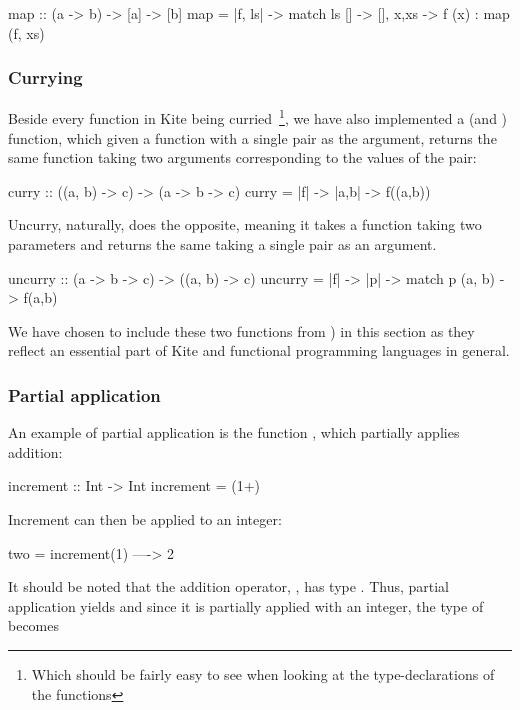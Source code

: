 \begin{kite}
map :: (a -> b) -> [a] -> [b]
map = |f, ls| -> {
  match ls {
    [] -> [],
    x,xs -> f (x) : map (f, xs)
  }
}
\end{kite}

\subsubsection{Currying}
\label{subsubsec:currying}
Beside every function in Kite being curried~\footnote{Which should be fairly easy to see when looking at the type-declarations of the functions}, we have also implemented a  (and ) function, which given a function with a single pair as the argument, returns the same function taking two arguments corresponding to the values of the pair:

\begin{kite}
curry :: ((a, b) -> c) -> (a -> b -> c)
curry = |f| -> {
  |a,b| -> {
    f((a,b))
  }
}
\end{kite}

Uncurry, naturally, does the opposite, meaning it takes a function taking two parameters and returns the same taking a single pair as an argument.

\begin{kite}
uncurry :: (a -> b -> c) -> ((a, b) -> c)
uncurry = |f| -> {
  |p| -> {
    match p {
      (a, b) -> f(a,b)
    }
  }
}
\end{kite}

We have chosen to include these two functions from ) in this section as they reflect an essential part of Kite and functional programming languages in general.

\subsubsection{Partial application}
An example of partial application is the function , which partially applies addition:

\begin{kite}
increment :: Int -> Int
increment = (1+)
\end{kite}

Increment can then be applied to an integer:

\begin{kite}
two = increment(1) ----> 2
\end{kite}

It should be noted that the addition operator, \code{+}, has type . Thus, partial application yields  and since
it is partially applied with an integer, the type of 
becomes 

